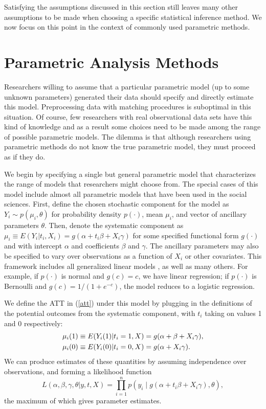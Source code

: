 \documentclass[11pt,titlepage]{article}
\begin{document}
Satisfying the assumptions discussed in this section still leaves many
other assumptions to be made when choosing a specific statistical
inference method.  We now focus on this point in the context of
commonly used parametric methods.

\section{Parametric Analysis Methods}

Researchers willing to assume that a particular parametric model (up
to some unknown parameters) generated their data should specify and
directly estimate this model.  Preprocessing data with matching
procedures is suboptimal in this situation.  Of course, few
researchers with real observational data sets have this kind of
knowledge and as a result some choices need to be made among the range
of possible parametric models.  The dilemma is that although
researchers using parametric methods do not know the true parametric
model, they must proceed as if they do.

We begin by specifying a single but general parametric model that
characterizes the range of models that researchers might choose from.
The special cases of this model include almost all parametric models
that have been used in the social sciences.  First, define the chosen
stochastic component for the model as $Y_i \sim p(\mu_i,\theta)$ for
probability density $p(\cdot)$, mean $\mu_i$, and vector of ancillary
parameters $\theta$.  Then, denote the systematic component as
$\mu_i\equiv E(Y_i|t_i,X_i)=g(\alpha + t_i\beta + X_i\gamma)$ for some
specified functional form $g(\cdot)$ and with intercept $\alpha$ and
coefficients $\beta$ and $\gamma$.  The ancillary parameters may also
be specified to vary over observations as a function of $X_i$ or other
covariates.  This framework includes all generalized linear models
\citep{McCNel89}, as well as many others.  For example, if $p(\cdot)$
is normal and $g(c)=c$, we have linear regression; if $p(\cdot)$ is
Bernoulli and $g(c)=1/(1+e^{-c})$, the model reduces to a logistic
regression.

We define the ATT in (\ref{att}) under this model by plugging in the
definitions of the potential outcomes from the systematic component,
with $t_i$ taking on values 1 and 0 respectively:
\begin{align}
  \label{matt}
\mu_i(1)&\equiv E(Y_i(1)|t_i=1,X)= g(\alpha + \beta + X_i\gamma),\notag \\
\mu_i(0)&\equiv E(Y_i(0)|t_i=0,X) = g(\alpha + X_i\gamma).
\end{align}
We can produce estimates of these quantities by assuming independence
over observations, and forming a likelihood function
\begin{equation}
  \label{lik}
  L(\alpha,\beta,\gamma,\theta|y, t, X) = \prod_{i=1}^n 
  p\left(y_i \mid g(\alpha + t_i\beta + X_i\gamma), \theta\right),
\end{equation}
the maximum of which gives parameter estimates.
\end{document}
